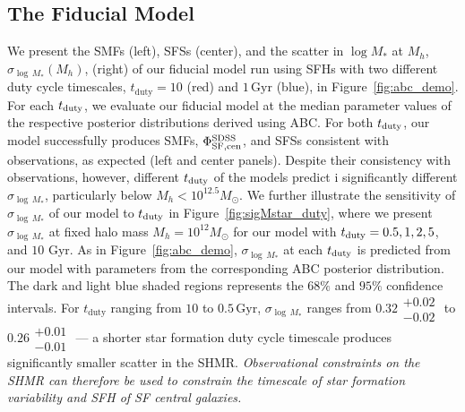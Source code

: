 \documentclass[12pt, letterpaper, preprint, tighten]{aastex62}
\newcommand{\edt}[1]{{\color{dred}{\bf} #1}}
\newcommand{\tduty}{t_{\rm duty}}
\begin{document}
\subsection{\edt{The Fiducial Model}} \label{sec:sfdutycycle}
We present the SMFs (left), SFSs (center), and the scatter in $\log M_*$ at $M_h$, 
$\sigma_{\log\,M_*}(M_h)$, (right) of our 
\edt{fiducial} 
model run using SFHs with two different duty cycle timescales, $t_\mathrm{duty} = 10$ (red) 
and $1\,\mathrm{Gyr}$ (blue), in Figure~\ref{fig:abc_demo}. For each $\tduty$, 
we evaluate our fiducial model at the median parameter values of the respective 
posterior distributions derived using ABC. For both $\tduty$, our model 
successfully produces SMFs, $\Phi^{\rm SDSS}_{\rm SF,cen}$, and SFSs consistent 
with observations, as expected (left and center panels). Despite their consistency 
with observations, however, different $t_{\rm duty}$ of the models predict i
significantly different $\sigma_{\log\,M_*}$, particularly below $M_h < 10^{12.5}M_\odot$. 
We further illustrate the sensitivity of $\sigma_{\log\,M_*}$ of our model to 
$\tduty$ in Figure~\ref{fig:sigMstar_duty}, where we present $\sigma_{\log\,M_*}$ at
fixed halo mass $M_h = 10^{12} M_\odot$ for our model with $t_{\rm duty} = 0.5, 1, 2, 5$, 
and $10$ Gyr. As in Figure~\ref{fig:abc_demo}, $\sigma_{\log\,M_*}$ at each $t_{\rm duty}$ 
is predicted from our model with parameters from the corresponding ABC posterior 
distribution. The dark and light blue shaded regions represents the $68\%$ and $95\%$ 
confidence intervals. For $t_\mathrm{duty}$ ranging from $10$ to $0.5\,\mathrm{Gyr}$,
$\sigma_{\log\,M_*}$ ranges from 
$0.32\substack{+0.02\\ -0.02}$ to $0.26\substack{+0.01\\-0.01}$
--- a shorter star formation duty cycle timescale produces significantly 
smaller scatter in the SHMR. \emph{Observational constraints on the SHMR 
can therefore be used to constrain the timescale of star formation 
variability and SFH of SF central galaxies.} 
\end{document}
